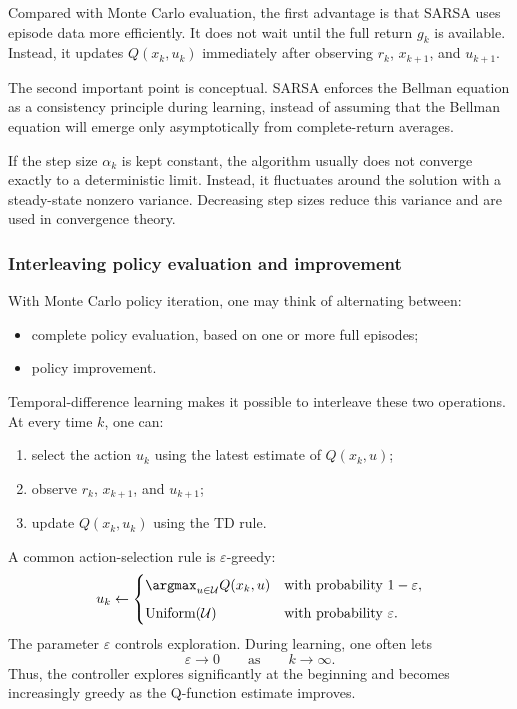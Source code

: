 Compared with Monte Carlo evaluation, the first advantage is that SARSA uses episode data
more efficiently. It does not wait until the full return \(g_k\) is available. Instead, it updates
\(Q(x_k,u_k)\) immediately after observing \(r_k\), \(x_{k+1}\), and \(u_{k+1}\).

The second important point is conceptual. SARSA enforces the Bellman equation as a
consistency principle during learning, instead of assuming that the Bellman equation will
emerge only asymptotically from complete-return averages.

If the step size \(\alpha_k\) is kept constant, the algorithm usually does not converge exactly to
a deterministic limit. Instead, it fluctuates around the solution with a steady-state nonzero
variance. Decreasing step sizes reduce this variance and are used in convergence theory.

\subsubsection{Interleaving policy evaluation and improvement}

With Monte Carlo policy iteration, one may think of alternating between:
\begin{itemize}
    \item complete policy evaluation, based on one or more full episodes;
    \item policy improvement.
\end{itemize}
Temporal-difference learning makes it possible to interleave these two operations. At every
time \(k\), one can:
\begin{enumerate}
    \item select the action \(u_k\) using the latest estimate of \(Q(x_k,u)\);
    \item observe \(r_k\), \(x_{k+1}\), and \(u_{k+1}\);
    \item update \(Q(x_k,u_k)\) using the TD rule.
\end{enumerate}

A common action-selection rule is \(\varepsilon\)-greedy:
\[
u_k
\leftarrow
\begin{cases}
\displaystyle \argmax_{u\in\cU} Q(x_k,u)
&
\text{with probability }1-\varepsilon,\\[2mm]
\text{Uniform}(\cU)
&
\text{with probability }\varepsilon.
\end{cases}
\]
The parameter \(\varepsilon\) controls exploration. During learning, one often lets
\[
\varepsilon\to 0
\qquad
\text{as}
\qquad
k\to\infty.
\]
Thus, the controller explores significantly at the beginning and becomes increasingly greedy as
the Q-function estimate improves.

